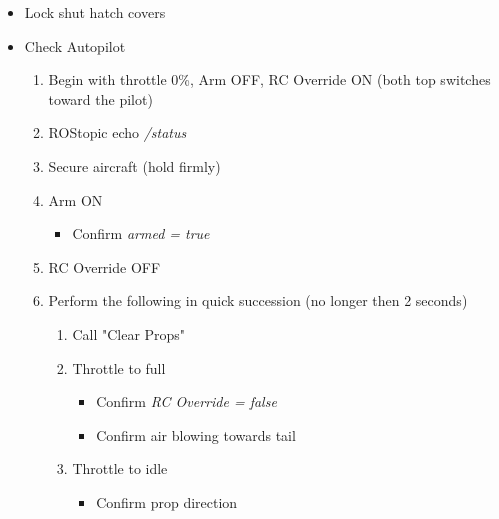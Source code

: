 \documentclass[]{auvsi_doc}
\begin{document}
\begin{itemize}
\begin{itemize}
	\end{itemize}
	\item Lock shut hatch covers
	\item Check Autopilot
	\begin{enumerate}
		\item Begin with throttle 0\%, Arm OFF, RC Override ON (both top switches toward the pilot)
		\item ROStopic echo \textit{/status}
		\item Secure aircraft (hold firmly)
		\item Arm ON
		\begin{itemize}
			\item Confirm \textit{armed = true}
		\end{itemize}
		\item RC Override OFF
		\item Perform the following in quick succession (no longer then 2 seconds)
		\begin{enumerate}
			\item Call "Clear Props"
			\item Throttle to full
			\begin{itemize}
				\item Confirm \textit{RC Override = false}
				\item Confirm air blowing towards tail
			\end{itemize}
			\item Throttle to idle
			\begin{itemize}
				\item Confirm prop direction
			\end{itemize}
		\end{enumerate}
	\end{enumerate}
\end{itemize}

\hrulefill
\end{document}
